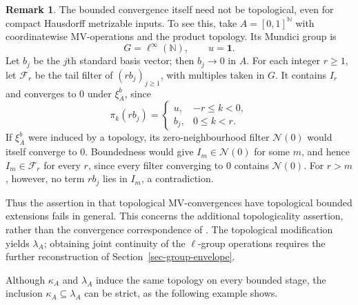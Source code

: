 \documentclass[preprint,3p]{elsarticle}
\theoremstyle{plain}
\theoremstyle{definition}
\newtheorem{rem}[thm]{Remark}
\numberwithin{equation}{section}
\begin{document}
\begin{rem}
The bounded convergence itself need not be topological, even for
compact Hausdorff metrizable inputs.  To see this, take
$A=[0,1]^{\mathbb N}$ with coordinatewise MV-operations and the
product topology.  Its Mundici group is
\[
 G=\ell^\infty(\mathbb N),\qquad u=\mathbf1.
\]
Let $b_j$ be the $j$th standard basis vector; then $b_j\to0$ in $A$.
For each integer $r\geq1$, let $\mathcal F_r$ be the tail filter of
$(r b_j)_{j\geq1}$, with multiples taken in $G$.
It contains $I_r$ and converges to $0$ under $\xi_A^b$, since
\[
 \pi_k(r b_j)=
 \begin{cases}
  u,&-r\leq k<0,\\
  b_j,&0\leq k<r.
 \end{cases}
\]
If $\xi_A^b$ were induced by a topology, its zero-neighbourhood
filter $\mathcal N(0)$ would itself converge to $0$.
Boundedness would give $I_m\in\mathcal N(0)$ for some $m$, and hence
$I_m\in\mathcal F_r$ for every $r$, since every filter converging
to $0$ contains $\mathcal N(0)$.
For $r>m$, however, no term $r b_j$ lies in $I_m$, a contradiction.

Thus the assertion in \cite[Remark~3.4(2)]{Ball2002} that
topological MV-convergences have topological bounded extensions
fails in general.  This concerns the additional topologicality
assertion, rather than the convergence correspondence of
\cite[Theorem~3.3]{Ball2002}.
The topological modification yields $\lambda_A$;
obtaining joint continuity of the $\ell$-group operations requires
the further reconstruction of Section~\ref{sec-group-envelope}.
\end{rem}

Although $\kappa_A$ and $\lambda_A$ induce the same topology on every
bounded stage, the inclusion
$\kappa_A\subseteq\lambda_A$ can be strict, as the
following example shows.
\end{document}
